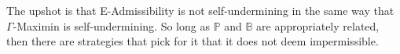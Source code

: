 \documentclass[a4paper,final]{article}
\newtheorem{proposition}[theorem]{Proposition}
\renewcommand\P{\mathbb{P}} %
\newcommand\EU{\mathrm{EU}}
\newcommand\EAd{\mathrm{EAd}}
\newcommand{\D}{\mathcal{D}}
\newcommand{\Decs}{\mathcal{D}}
\renewcommand\S{\mathcal{S}}
\newcommand\s{\mathsf{s}}
\newcommand{\IB}{\mathbb{B}}
\newcommand{\IP}{\P}
\newcommand{\todoold}[2][]{\todo[backgroundcolor=white,bordercolor=orange!10,linecolor=gray!10, #1,caption={},textcolor=gray]{Pre-rev: #2}}
\newcommand{\todooldinfo}[2][]{\todoold[#1]{#2}}
\renewcommand{\color}[1]{}
\newcommand{\Strategies}{\S}
\newcommand\SetDelimiter[1][]{
	\nonscript\,#1\vert \allowbreak \nonscript\,\mathopen{}}
\providecommand\given{\SetDelimiter}
\newcommand*\diff{\mathop{}\!\mathrm{d}}
\renewcommand{\geq}{\geqslant}
\newenvironment{CCM rewritten}
{\begingroup\color{blue}} %
{\endgroup}              %
\begin{document}
 
 
%	
The upshot is that E-Admissibility is not self-undermining in the same way that $\Gamma$-Maximin is self-undermining. So long as $\IP$ and $\IB$ are appropriately related, then there are strategies that pick for it that it does not deem impermissible.
\end{document}

